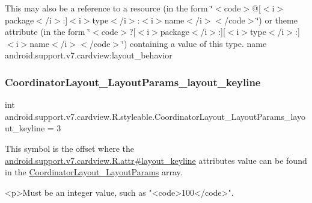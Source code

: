 This may also be a reference to a resource (in the form \char`\"{}$<$code$>$@\mbox{[}$<$i$>$package$<$/i$>$\+:\mbox{]}$<$i$>$type$<$/i$>$\+:$<$i$>$name$<$/i$>$$<$/code$>$\char`\"{}) or theme attribute (in the form \char`\"{}$<$code$>$?\mbox{[}$<$i$>$package$<$/i$>$\+:\mbox{]}\mbox{[}$<$i$>$type$<$/i$>$\+:\mbox{]}$<$i$>$name$<$/i$>$$<$/code$>$\char`\"{}) containing a value of this type.  name android.\+support.\+v7.\+cardview\+:layout\+\_\+behavior \mbox{\label{classandroid_1_1support_1_1v7_1_1cardview_1_1R_1_1styleable_a8438ddb43a953883a300596ca7b1f39e}} 
\subsubsection{\texorpdfstring{Coordinator\+Layout\+\_\+\+Layout\+Params\+\_\+layout\+\_\+keyline}{CoordinatorLayout\_LayoutParams\_layout\_keyline}}
{\footnotesize\ttfamily int android.\+support.\+v7.\+cardview.\+R.\+styleable.\+Coordinator\+Layout\+\_\+\+Layout\+Params\+\_\+layout\+\_\+keyline = 3\hspace{0.3cm}{\ttfamily [static]}}

This symbol is the offset where the \hyperlink{classandroid_1_1support_1_1v7_1_1cardview_1_1R_1_1attr_a0173619a13c61cef19ff10fee171e66a}{android.\+support.\+v7.\+cardview.\+R.\+attr\#layout\+\_\+keyline} attribute\textquotesingle{}s value can be found in the \hyperlink{classandroid_1_1support_1_1v7_1_1cardview_1_1R_1_1styleable_afac1c5752b8eb35d30db48df7a9eea89}{Coordinator\+Layout\+\_\+\+Layout\+Params} array.

\begin{DoxyVerb}      <p>Must be an integer value, such as "<code>100</code>".
\end{DoxyVerb}
 

